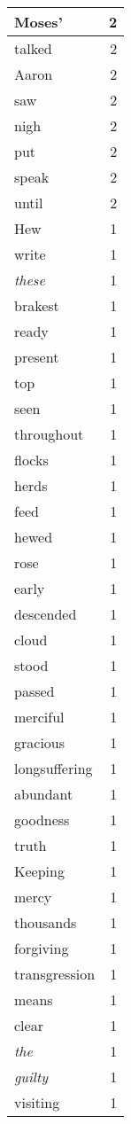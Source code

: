 \begin{center}
\begin{longtable}{l|r}
Moses' & 2 \\ \hline
talked & 2 \\ \hline
Aaron & 2 \\ \hline
saw & 2 \\ \hline
nigh & 2 \\ \hline
put & 2 \\ \hline
speak & 2 \\ \hline
until & 2 \\ \hline
Hew & 1 \\ \hline
write & 1 \\ \hline
\emph{these} & 1 \\ \hline
brakest & 1 \\ \hline
ready & 1 \\ \hline
present & 1 \\ \hline
top & 1 \\ \hline
seen & 1 \\ \hline
throughout & 1 \\ \hline
flocks & 1 \\ \hline
herds & 1 \\ \hline
feed & 1 \\ \hline
hewed & 1 \\ \hline
rose & 1 \\ \hline
early & 1 \\ \hline
descended & 1 \\ \hline
cloud & 1 \\ \hline
stood & 1 \\ \hline
passed & 1 \\ \hline
merciful & 1 \\ \hline
gracious & 1 \\ \hline
longsuffering & 1 \\ \hline
abundant & 1 \\ \hline
goodness & 1 \\ \hline
truth & 1 \\ \hline
Keeping & 1 \\ \hline
mercy & 1 \\ \hline
thousands & 1 \\ \hline
forgiving & 1 \\ \hline
transgression & 1 \\ \hline
means & 1 \\ \hline
clear & 1 \\ \hline
\emph{the} & 1 \\ \hline
\emph{guilty} & 1 \\ \hline
visiting & 1 \\ \hline

\end{longtable}
\end{center}
